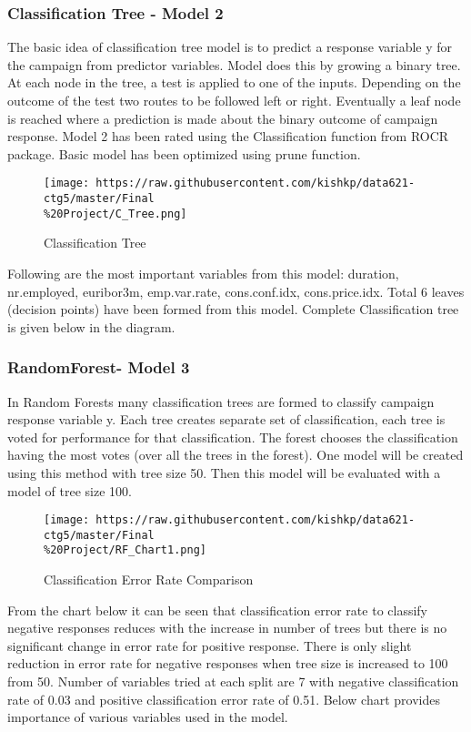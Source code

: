 \documentclass[english,floatsintext,man]{apa6}
\begin{document}
\subsubsection{Classification Tree - Model
2}\label{classification-tree---model-2}

The basic idea of classification tree model is to predict a response
variable y for the campaign from predictor variables. Model does this by
growing a binary tree. At each node in the tree, a test is applied to
one of the inputs. Depending on the outcome of the test two routes to be
followed left or right. Eventually a leaf node is reached where a
prediction is made about the binary outcome of campaign response. Model
2 has been rated using the Classification function from ROCR package.
Basic model has been optimized using prune function.

\begin{figure}[htbp]
\centering
\texttt{[image: https://raw.githubusercontent.com/kishkp/data621-ctg5/master/Final\\\%20Project/C\_Tree.png]}
\caption{Classification Tree}
\end{figure}

Following are the most important variables from this model: duration,
nr.employed, euribor3m, emp.var.rate, cons.conf.idx, cons.price.idx.
Total 6 leaves (decision points) have been formed from this model.
Complete Classification tree is given below in the diagram.

\newpage

\subsubsection{RandomForest- Model 3}\label{randomforest--model-3}

In Random Forests many classification trees are formed to classify
campaign response variable y. Each tree creates separate set of
classification, each tree is voted for performance for that
classification. The forest chooses the classification having the most
votes (over all the trees in the forest). One model will be created
using this method with tree size 50. Then this model will be evaluated
with a model of tree size 100.

\begin{figure}[htbp]
\centering
\texttt{[image: https://raw.githubusercontent.com/kishkp/data621-ctg5/master/Final\\\%20Project/RF\_Chart1.png]}
\caption{Classification Error Rate Comparison}
\end{figure}

From the chart below it can be seen that classification error rate to
classify negative responses reduces with the increase in number of trees
but there is no significant change in error rate for positive response.
There is only slight reduction in error rate for negative responses when
tree size is increased to 100 from 50. Number of variables tried at each
split are 7 with negative classification rate of 0.03 and positive
classification error rate of 0.51. Below chart provides importance of
various variables used in the model.
\end{document}

